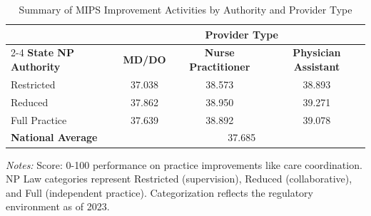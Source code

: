 \begin{table}[htbp]
    \centering
    \caption{Summary of MIPS Improvement Activities by Authority and Provider Type}
    \label{tab:mips_ia_score_provtype}
    \vspace{0.2cm}
    \begin{tabular}{lccc}
        \toprule
        & \multicolumn{3}{c}{\textbf{Provider Type}} \\
        \cmidrule(lr){2-4}
        \textbf{State NP Authority} & \textbf{MD/DO} & \textbf{Nurse Practitioner} & \textbf{Physician Assistant} \\
        \midrule
        Restricted & 37.038 & 38.573 & 38.893 \\
        Reduced & 37.862 & 38.950 & 39.271 \\
        Full Practice & 37.639 & 38.892 & 39.078 \\
        \midrule
        \textbf{National Average} & \multicolumn{3}{c}{37.685} \\
        \bottomrule
    \end{tabular}
    \vspace{0.1cm}
    \begin{minipage}{0.85\textwidth}
        \footnotesize \textit{Notes:} Score: 0-100 performance on practice improvements like care coordination. NP Law categories represent Restricted (supervision), Reduced (collaborative), and Full (independent practice). Categorization reflects the regulatory environment as of 2023.
    \end{minipage}
\end{table}